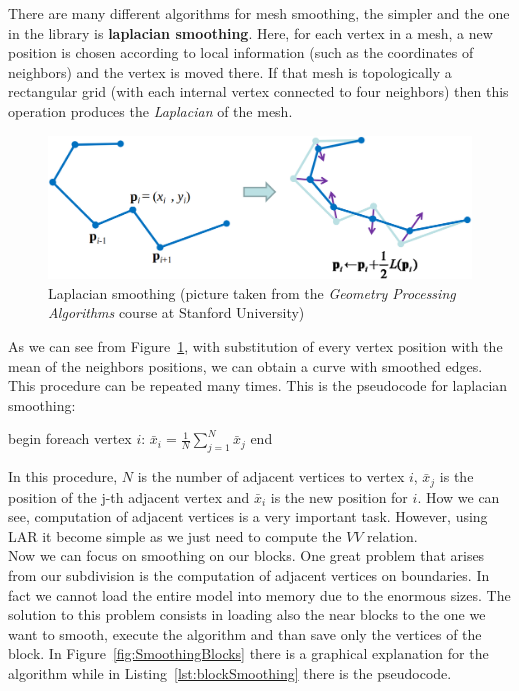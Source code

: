 There are many different algorithms for mesh smoothing, the simpler and the one in the library is \textbf{laplacian smoothing}. Here, for each vertex in a mesh, a new position is chosen according to local information (such as the coordinates of neighbors) and the vertex is moved there. If that mesh is topologically a rectangular grid (with each internal vertex connected to four neighbors) then this operation produces the \textit{Laplacian} of the mesh.
\begin{figure}[htb] %
   \centering
   \includegraphics[width=0.60\linewidth]{images/LaplacianSmoothing.png}
   \caption[Laplacian smoothing]{Laplacian smoothing (picture taken from the \textit{Geometry Processing Algorithms} course at Stanford University)}
   \label{fig:laplacianSmoothing}
\end{figure}

As we can see from Figure~\ref{fig:laplacianSmoothing}, with substitution of every vertex position with the mean of the neighbors positions, we can obtain a curve with smoothed edges. This procedure can be repeated many times. This is the pseudocode for laplacian smoothing:\newpage

\begin{pseudo}[caption={Laplacian smoothing}, label={lst:laplacianSmoothing}]
begin
  foreach vertex $i$:
    $\bar{x}_{i}= \displaystyle\frac{1}{N} \displaystyle\sum_{j=1}^{N}\bar{x}_j$
end
\end{pseudo}

In this procedure, $N$ is the number of adjacent vertices to vertex $i$, $\bar{x}_{j}$ is the position of the j-th adjacent vertex and $\bar{x}_{i}$ is the new position for $i$. How we can see, computation of adjacent vertices is a very important task. However, using LAR it become simple as we just need to compute the $VV$ relation.\\

Now we can focus on smoothing on our blocks. One great problem that arises from our subdivision is the computation of adjacent vertices on boundaries. In fact we cannot load the entire model into memory due to the enormous sizes. The solution to this problem consists in loading also the near blocks to the one we want to smooth, execute the algorithm and than save only the vertices of the block. In Figure~\ref{fig:SmoothingBlocks} there is a graphical explanation for the algorithm while in Listing~\ref{lst:blockSmoothing} there is the pseudocode.

